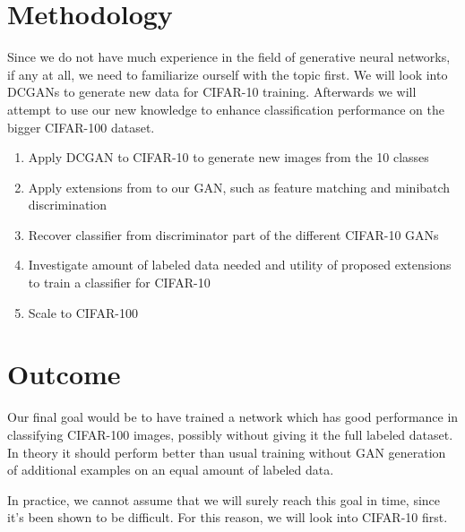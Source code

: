 \documentclass[10pt,twocolumn,letterpaper]{article}
\begin{document}
\section{Methodology}
    Since we do not have much experience in the field of generative neural networks, if any at all, we need to familiarize ourself with the topic first. We will look into DCGANs to generate new data for CIFAR-10 training. Afterwards we will attempt to use our new knowledge to enhance classification performance on the bigger CIFAR-100 dataset.
    \begin{enumerate}
        \item Apply DCGAN to CIFAR-10 to generate new images from the 10 classes %
        \item Apply extensions from \cite{salimans2016improved} to our GAN, such as feature matching and minibatch discrimination
        \item Recover classifier from discriminator part of the different CIFAR-10 GANs
        \item Investigate amount of labeled data needed and utility of proposed extensions to train a classifier for CIFAR-10
        \item Scale to CIFAR-100
    \end{enumerate}

\section{Outcome}
    Our final goal would be to have trained a network which has good performance in classifying CIFAR-100 images, possibly without giving it the full labeled dataset. In theory it should perform better than usual training without GAN generation of additional examples on an equal amount of labeled data. 

    In practice, we cannot assume that we will surely reach this goal in time, since it's been shown to be difficult. For this reason, we will look into CIFAR-10 first.

{\small


}
\end{document}
